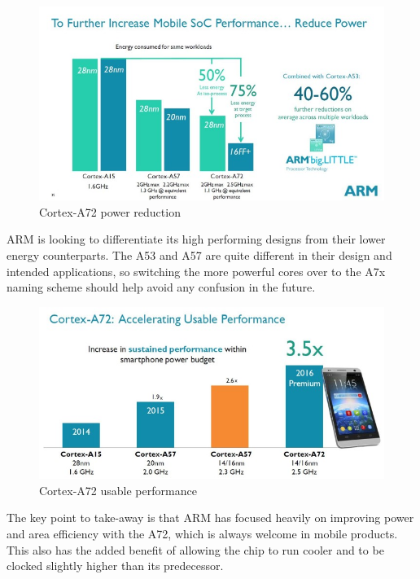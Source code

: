 \documentclass[12pt]{article}
\begin{document}
\begin{figure}[H]
\begin{center}
\includegraphics[width=0.8\linewidth]{imgs/foto3.jpg}
\caption{Cortex-A72 power reduction}
\label{cortexA72power}
\end{center}
\end{figure}

ARM is looking to differentiate its high performing designs from their lower energy counterparts. The A53 and A57 are quite different in their design and intended applications, so switching the more powerful cores over to the A7x naming scheme should help avoid any confusion in the future.\cite{androidauthority}

\begin{figure}[H]
\begin{center}
\includegraphics[width=0.8\linewidth]{imgs/foto4.jpg}
\caption{Cortex-A72 usable performance}
\label{cortexA72usable}
\end{center}
\end{figure}

The key point to take-away is that ARM has focused heavily on improving power and area efficiency with the A72, which is always welcome in mobile products. This also has the added benefit of allowing the chip to run cooler and to be clocked slightly higher than its predecessor.\cite{androidauthority}

\end{document}
